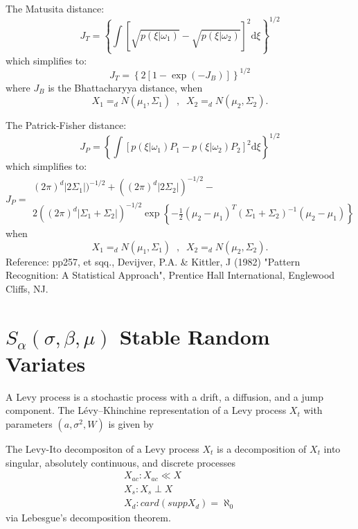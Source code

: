 The Matusita distance:
\[J_T  = \left\{ {\int {\left[ {\sqrt {p(\xi \left| {\omega _1 }
\right.)}  - \sqrt {p(\xi \left| {\omega _2 } \right.)} } \right]}
^2 {\text{d}}\xi } \right\}^{{1 / 2}} \] which simplifies to: \[
J_T = \left\{ {2\left[ {1 - \exp ( - J_B )} \right]}
\right\}^{{1/2 }} \] where $J_B$ is the Bhattacharyya distance,
when \[X_1 =_d  N(\mu_1,\Sigma_1) \;\; , \;\; X_2 =_d
N(\mu_2,\Sigma_2).\]

The Patrick-Fisher distance:
\[J_P  = \left\{ {\int {\left[ {p(\xi \left| {\omega _1 }
\right.)P_1  - p(\xi \left| {\omega _2 } \right.)P_2 } \right]} ^2
{\text{d}}\xi } \right\}^{{1/2}}\] which simplifies to:\[J_P =
\begin{array}{cc} {(2\pi )^d \left| {2\Sigma _1 } \right|} )^{ -
{1/2}} + ( {(2\pi )^d \left| {2\Sigma _2 } \right|} )^{ - {1/2}} -
\\ 2( {(2\pi )^d \left| {\Sigma _1  + \Sigma _2 } \right|}
)^{-{1/2}} \exp \left\{ { - \tfrac{1} {2}(\mu _2  - \mu _1
)^T(\Sigma _1  + \Sigma _2 )^{ - 1} (\mu _2  - \mu _1 )}
\right\}\end{array}\] when \[X_1 =_d N(\mu_1,\Sigma_1) \;\;  ,
\;\; X_2 =_d N(\mu_2,\Sigma_2).\]
 Reference: pp257, et sqq., Devijver, P.A.
\& Kittler, J (1982) "Pattern Recognition: A Statistical
Approach", Prentice Hall International, Englewood Cliffs, NJ.

\section{$S_\alpha(\sigma,\beta,\mu)$ Stable Random Variates}

A Levy process is a stochastic process with a drift, a diffusion, and a jump component.
The Lévy–Khinchine representation of a Levy process $X_t$ with parameters $(a,\sigma^2,W)$
is given by

The Levy-Ito decompositon of a Levy process $X_t$ is a decomposition of $X_t$ into
singular, absolutely continuous, and discrete processes
\begin{eqnarray*}
 X_{ac} : X_{ac} \ll X \\
 X_s : X_s \perp X \\
 X_d : card (supp X_d) = \aleph_0
\end{eqnarray*}
via Lebesgue's decomposition theorem.



